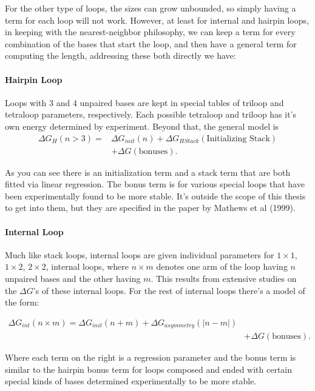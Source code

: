 For the other type of loops, the sizes can grow unbounded, so simply
having a term for each loop will not work. However, at least for
internal and hairpin loops, in keeping with the nearest-neighbor
philosophy, we can keep a term for every combination of the bases that
start the loop, and then have a general term for computing the length,
addressing these both directly we have:

\paragraph{Hairpin Loop} 
Loops with 3 and 4 unpaired bases are kept in special tables of
triloop and tetraloop parameters, respectively. Each possible
tetraloop and triloop has it's own energy determined by
experiment. Beyond that, the general model is 
\begin{align}
\Delta G_H(n > 3) = & \Delta G_{init}(n) + \Delta
G_{HStack} (\text{Initializing Stack}) \\
&+ \Delta G (\text{bonuses}).
\end{align}

As you can see there is an initialization term and a stack term that
are both fitted via linear regression. The bonus term is for various
special loops that have been experimentally found to be more
stable. It's outside the scope of this thesis to get into them, but
they are specified in the paper by Mathews et al (1999).

\paragraph{Internal Loop}
Much like stack loops, internal loops are given individual parameters
for $1 \times 1$, $1 \times 2$, $2 \times 2$, internal loops, where $n
\times m$ denotes one arm of the loop having $n$ unpaired bases and
the other having $m$. This results from extensive studies on the
$\Delta G$'s of these internal loops. For the rest of internal loops
there's a model of the form:

\begin{align}
 \Delta G_{int} ( n \times m ) = \Delta G_{init} (n + m) + \Delta G_{asymmetry} (| n - m |) \\
& + \Delta G ( \text{bonuses}).
\end{align}

Where each term on the right is a regression parameter and the bonus
term is similar to the hairpin bonus term for loops composed and ended
with certain special kinds of bases determined experimentally to be
more stable.

